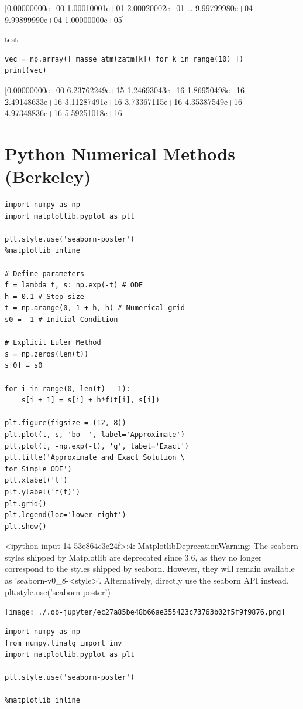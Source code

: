\documentclass[11pt]{article}
\begin{document}
[0.00000000e+00 1.00010001e+01 2.00020002e+01 \ldots{} 9.99799980e+04
 9.99899990e+04 1.00000000e+05]


test 

\begin{verbatim}
vec = np.array([ masse_atm(zatm[k]) for k in range(10) ])
print(vec)
\end{verbatim}


[0.00000000e+00 6.23762249e+15 1.24693043e+16 1.86950498e+16
 2.49148633e+16 3.11287491e+16 3.73367115e+16 4.35387549e+16
 4.97348836e+16 5.59251018e+16]


\section{Python Numerical Methods (Berkeley)}
\label{sec:org9d769fa}

\begin{verbatim}
import numpy as np
import matplotlib.pyplot as plt

plt.style.use('seaborn-poster')
%matplotlib inline

# Define parameters
f = lambda t, s: np.exp(-t) # ODE
h = 0.1 # Step size
t = np.arange(0, 1 + h, h) # Numerical grid
s0 = -1 # Initial Condition

# Explicit Euler Method
s = np.zeros(len(t))
s[0] = s0

for i in range(0, len(t) - 1):
    s[i + 1] = s[i] + h*f(t[i], s[i])

plt.figure(figsize = (12, 8))
plt.plot(t, s, 'bo--', label='Approximate')
plt.plot(t, -np.exp(-t), 'g', label='Exact')
plt.title('Approximate and Exact Solution \
for Simple ODE')
plt.xlabel('t')
plt.ylabel('f(t)')
plt.grid()
plt.legend(loc='lower right')
plt.show()
\end{verbatim}

<ipython-input-14-53e864c3c24f>:4: MatplotlibDeprecationWarning: The seaborn styles shipped by Matplotlib are deprecated since 3.6, as they no longer correspond to the styles shipped by seaborn. However, they will remain available as 'seaborn-v0\_8-<style>'. Alternatively, directly use the seaborn API instead.
  plt.style.use('seaborn-poster')
\begin{center}
\texttt{[image: ./.ob-jupyter/ec27a85be48b66ae355423c73763b02f5f9f9876.png]}
\end{center}

\begin{verbatim}
import numpy as np
from numpy.linalg import inv
import matplotlib.pyplot as plt

plt.style.use('seaborn-poster')

%matplotlib inline 

\end{verbatim}
\end{document}
